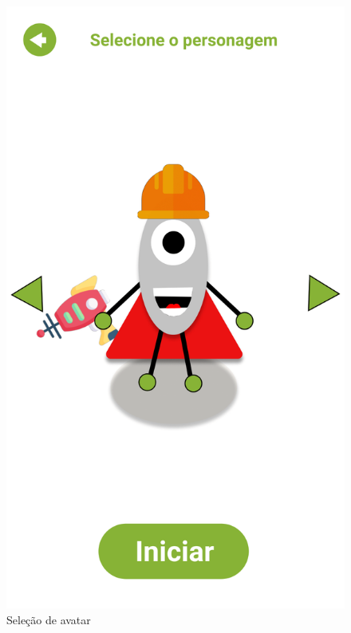 \documentclass[]{scrartcl}
\begin{document}
\begin{figure}[H]
	\begin{center}
		\includegraphics[scale=0.3]{figs/Game Design-06.png}
		\caption{Seleção de avatar}
	\end{center}
\end{figure}
\end{document}
